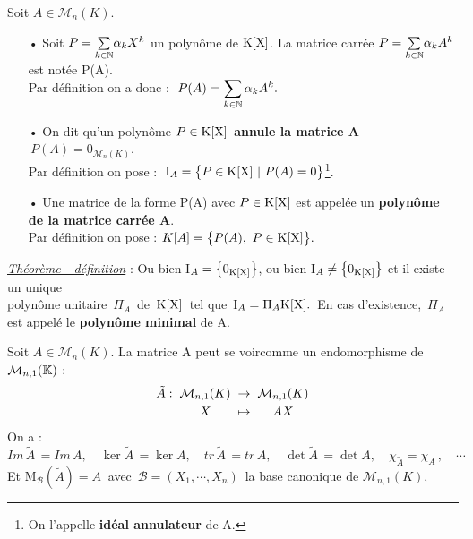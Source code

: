 Soit \(A\in \mathcal{M}_{n}(K).\)
\begin{itemize}[leftmargin=0.2cm]
    \item[•] Soit \(P=\underset{k\in \mathbb{N}}{\sum}\alpha_k X^k \) un polynôme de $\text{K}[\text{X}]$. La matrice carrée \(P=\underset{k\in \mathbb{N}}{\sum}\alpha_k A^k \) est notée P(A).\vspace{-0.1cm}\\
    Par définition on a donc : \(\displaystyle \ P(A)=\sum_{k\in \NN}\alpha_k A^k.\)\vspace{0.1cm}

    \item[•] On dit qu'un polynôme \(P\in \text{K}[\text{X}]\,\) \textbf{annule la matrice A} \ssi \(\,\displaystyle P(A)=0_{\mathcal{M}_n(K)}\).\vspace{0.1cm}\\
    Par définition on pose : \(\displaystyle \;\text{I}_A = \bigl\{P\in \text{K}[\text{X}] \ \rvert \ P(A)=0\bigr\}\)\footnote{On l'appelle \textbf{idéal annulateur} de A.}.\vspace{0.1cm}

    \item[•] Une matrice de la forme P(A) avec \(P\in \text{K}[\text{X}]\) est appelée un \textbf{polynôme de la matrice carrée A}.\vspace{0.1cm}\\
    Par définition on pose : \(K[A]=\bigl\{P(A),\ P\in \poly\bigr\}.\)
\end{itemize}

\vspace{1.3cm}

\underline{\emph{Théorème - définition}} : Ou bien I\(_A=\left\{0_{\text{K}[\text{X}]}\right\}\), ou bien I\(_A\neq\left\{0_{\text{K}[\text{X}]}\right\}\) et il existe un unique\vspace{0.1cm}\\
polynôme unitaire \(\,\Pi_A\,\) de $\,\text{K}[\text{X}]\,$ tel que\, I\(_A=\Pi_A\text{K}[\text{X}].\,\) En cas d'existence, \(\,\Pi_A\,\) est appelé le \textbf{polynôme minimal} de A.

\vspace{1cm}

Soit \(A\in \mathcal{M}_n(K)\).
La matrice A peut se \guillemetleft voir\guillemetright\;comme un endomorphisme de \(\mathcal{M}_{n,1}(\mathbb{K})\) :\vspace{-0.17cm}
\[\arraycolsep=0.1cm\begin{array}{rccc}
    \tilde{A}: & \mathcal{M}_{n,1}(K) & \to & \mathcal{M}_{n,1}(K)\vspace{0.1cm} \\
    & X & \mapsto & AX
\end{array}\]\vspace{-0.1cm}
On a : \(Im\, \tilde{A}\,=Im\, A,\quad \ker \tilde{A} \,=\ker A,\quad tr\,\tilde{A} \,=tr\,A,\quad \det \tilde{A} \,=\det A,\quad \chi_{\tilde{A}}=\chi_A\,,\quad \cdots\)\vspace{0.1cm}\\
Et M\(_\mathcal{B}(\tilde{A})=A\ \) avec \(\,\mathcal{B}=(X_1,\cdots, X_n)\,\) la base canonique de \(\mathcal{M}_{n,1}(K)\),\vspace{0.2cm}

